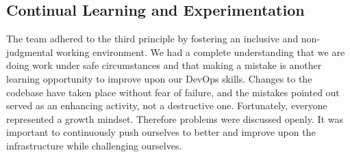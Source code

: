 \subsection*{Continual Learning and Experimentation}
The team adhered to the third principle by fostering an inclusive and non-judgmental working environment. We had a complete understanding that we are doing work under safe circumstances and that making a mistake is another learning opportunity to improve upon our DevOps skills. Changes to the codebase have taken place without fear of failure, and the mistakes pointed out served as an enhancing activity, not a destructive one. Fortunately, everyone represented a growth mindset. Therefore problems were discussed openly. It was important to continuously push ourselves to better and improve upon the infrastructure while challenging ourselves.